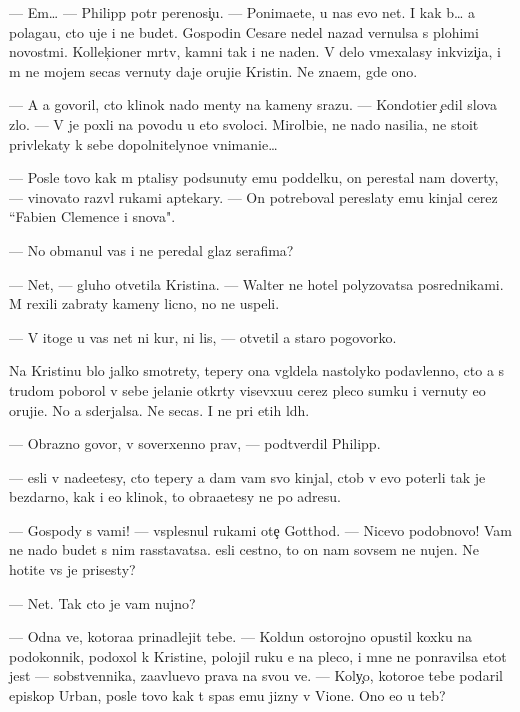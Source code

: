\documentclass[10pt]{book}
\begin{document}
— Em… — Philipp pot{\e}r perenosi{\c}u. — Ponima{\y}ete, u nas {\y}evo net. I kak b{\yi}… {\y}a polaga{\y}u, cto uje i ne budet. Gospodin Cesare nedel{\iu} nazad vernulsa s plohimi novost{\ia}mi. Kollek{\c}ioner m{\e}rtv, kamni tak i ne na{\y}den{\yi}. V delo vmexalasy inkvizi{\c}i{\y}a, i m{\yi} ne mojem se{\y}cas vernuty daje oruji{\y}e Kristin{\yi}. Ne zna{\y}em, gde ono.

— A {\y}a govoril, cto klinok nado men{\ia}ty na kameny srazu. — Kondotier {\c}edil slova zlo. — V{\yi} je poxli na povodu u eto{\y} svoloci. Mirol{\iu}bi{\y}e, ne nado nasili{\y}a, ne sto{\y}it privlekaty k sebe dopolnitelyno{\y}e vnimani{\y}e…

— Posle tovo kak m{\yi} p{\yi}talisy podsunuty {\y}emu poddelku, on perestal nam dover{\ia}ty, — vinovato razv{\e}l rukami aptekary. — On potreboval pereslaty {\y}emu kinjal cerez ``Fabien Clemence i s{\yi}nov{\y}a".

— No obmanul vas i ne peredal glaz serafima?

— Net, — gluho otvetila Kristina. — Walter ne hotel polyzovatsa posrednikami. M{\yi} rexili zabraty kameny licno, no ne uspeli.

— V itoge u vas net ni kur, ni lis{\yi}, — otvetil {\y}a staro{\y} pogovorko{\y}.

Na Kristinu b{\yi}lo jalko smotrety, tepery ona v{\yi}gl{\ia}dela nastolyko podavlenno{\y}, cto {\y}a s trudom poborol v sebe jelani{\y}e otkr{\yi}ty visevxu{\y}u cerez pleco sumku i vernuty {\y}e{\y}o oruji{\y}e. No {\y}a sderjalsa. Ne se{\y}cas. I ne pri etih l{\iu}d{\ia}h.

— Obrazno govor{\ia}, v{\yi} soverxenno prav{\yi}, — podtverdil Philipp.

— {\Y}esli v{\yi} nade{\y}etesy, cto tepery {\y}a dam vam svo{\y} kinjal, ctob{\yi} v{\yi} {\y}evo poter{\ia}li tak je bezdarno, kak i {\y}e{\y}o klinok, to obra{\x}a{\y}etesy ne po adresu.

— Gospody s vami! — vsplesnul rukami ote{\c} Gotthod. — Nicevo podobnovo! Vam ne nado budet s nim rasstavatsa. {\Y}esli cestno, to on nam sovsem ne nujen. Ne hotite vs{\e} je prisesty?

— Net. Tak cto je vam nujno?

— Odna ve{\x}, kotora{\y}a prinadlejit tebe. — Koldun ostorojno opustil koxku na podokonnik, podoxol k Kristine, polojil ruku {\y}e{\y} na pleco, i mne ne ponravilsa etot jest — sobstvennika, za{\y}avl{\ia}{\y}u{\x}evo prava na svo{\y}u ve{\x}. — Koly{\c}o, kotoro{\y}e tebe podaril {\y}episkop Urban, posle tovo kak t{\yi} spas {\y}emu jizny v Vione. Ono {\y}e{\x}o u teb{\ia}?
\end{document}
